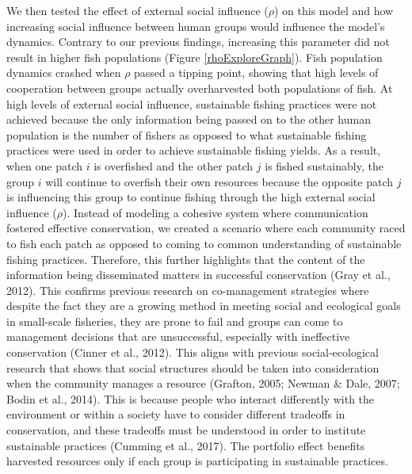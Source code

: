 \documentclass[
  12pt,
]{article}
\begin{document}
We then tested the effect of external social influence (\(\rho\)) on this model and how increasing social influence between human groups would influence the model's dynamics. Contrary to our previous findings, increasing this parameter did not result in higher fish populations (Figure \ref{rhoExploreGraph}). Fish population dynamics crashed when \(\rho\) passed a tipping point, showing that high levels of cooperation between groups actually overharvested both populations of fish. At high levels of external social influence, sustainable fishing practices were not achieved because the only information being passed on to the other human population is the number of fishers as opposed to what sustainable fishing practices were used in order to achieve sustainable fishing yields. As a result, when one patch \(i\) is overfished and the other patch \(j\) is fished sustainably, the group \(i\) will continue to overfish their own resources because the opposite patch \(j\) is influencing this group to continue fishing through the high external social influence (\(\rho\)). Instead of modeling a cohesive system where communication fostered effective conservation, we created a scenario where each community raced to fish each patch as opposed to coming to common understanding of sustainable fishing practices. Therefore, this further highlights that the content of the information being disseminated matters in successful conservation (Gray et al., 2012). This confirms previous research on co-management strategies where despite the fact they are a growing method in meeting social and ecological goals in small-scale fisheries, they are prone to fail and groups can come to management decisions that are unsuccessful, especially with ineffective conservation (Cinner et al., 2012). This aligns with previous social-ecological research that shows that social structures should be taken into consideration when the community manages a resource (Grafton, 2005; Newman \& Dale, 2007; Bodin et al., 2014). This is because people who interact differently with the environment or within a society have to consider different tradeoffs in conservation, and these tradeoffs must be understood in order to institute sustainable practices (Cumming et al., 2017). The portfolio effect benefits harvested resources only if each group is participating in sustainable practices.
\end{document}
